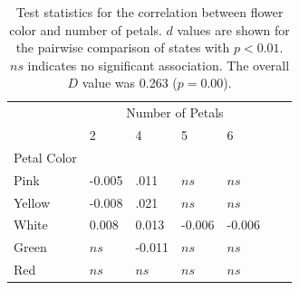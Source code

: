 \documentclass[review]{elsarticle}
\begin{document}
\begin{table}
   \center
   \begin{adjustbox}{max width=\textwidth}
      \setlength{\tabcolsep}{20pt}
      \begin{tabular}{lllllll}
         \toprule
	 & \multicolumn{4}{c}{Number of Petals} \\
         & 2 & 4 & 5 & 6 \\ 
	 \cmidrule{2-5}
	 Petal Color \\
         \hspace{3 mm} Pink & -0.005 & .011 & $ns$ & $ns$ \\
	 \hspace{3 mm} Yellow & -0.008 & .021 & $ns$ & $ns$ \\
	 \hspace{3 mm} White & 0.008 & 0.013 & -0.006 & -0.006 \\
	 \hspace{3 mm} Green & $ns$ & -0.011 & $ns$ & $ns$ \\
	 \hspace{3 mm} Red & $ns$ & $ns$ & $ns$ & $ns$ \\
         \bottomrule
      \end{tabular}
   \end{adjustbox}
   \caption{Test statistics for the correlation between flower color and number of petals. 
	    $d$ values are shown
            for the pairwise comparison of states with $p< 0.01$. $ns$ indicates no significant
	    association. The overall $D$ value was 0.263 ($p=0.00$).
	    }
   \label{correlations}
\end{table}
\end{document}
